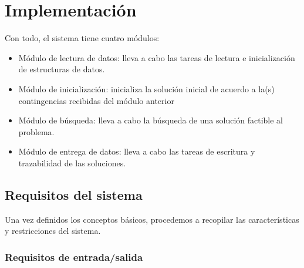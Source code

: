 
\section{Implementación} \label{apartado:4}




Con todo, el sistema tiene cuatro módulos:
\begin{itemize}
	\item Módulo de lectura de datos: lleva a cabo las tareas de lectura e inicialización de estructuras de datos.
	\item Módulo de inicialización: inicializa la solución inicial de acuerdo a la(s) contingencias recibidas del módulo anterior
	\item Módulo de búsqueda: lleva a cabo la búsqueda de una solución factible al problema.
	\item Módulo de entrega de datos: lleva a cabo las tareas de escritura y trazabilidad de las soluciones.
\end{itemize}



\subsection{Requisitos del sistema}
Una vez definidos los conceptos básicos, procedemos a recopilar las características y restricciones del sistema.

\subsubsection{Requisitos de entrada/salida}

